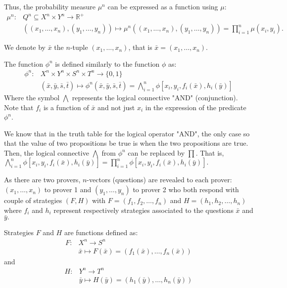 Thus, the probability measure $\mu^n$ can be expressed as a function using $\mu$: 
 \begin{align*}
\mu^n:  & Q^n \subseteq X^n \times Y^n  \longrightarrow \mathbb{R}^+ \\
  & ((x_1,\ldots, x_n), (y_1,\ldots, y_n)) \longmapsto \mu^n((x_1,\ldots, x_n), (y_1,\ldots, y_n))=\prod_{i=1}^n  \mu (x_i, y_i). 
 \end{align*}
 
We denote by  $\bar{x}$ the $n$-tuple $(x_1,\ldots, x_n)$, that is $\bar{x}=(x_1,\ldots, x_n)$. 

The function $\phi^n$ is defined similarly to the function $ \phi$ as:
\begin{align*}
\phi^n: & X^n \times Y^n \times S^n \times T^n  \longrightarrow  \{0,1\}\\ 
& (\bar{x}, \bar{y},\bar{s}, \bar{t})  \longmapsto  \phi^n(\bar{x}, \bar{y},\bar{s}, \bar{t}) = \bigwedge\limits_{i=1}^n \phi [x_i,y_i, f_i(\bar{x}), h_i(\bar{y})]
\end{align*}
Where the symbol $\bigwedge$ represents the logical connective "AND" (conjunction).
Note that $f_i$ is a function of $\bar{x}$ and not just $x_i$  in the expression of the predicate $\phi^n$.

We know that in the truth table for the logical operator "AND", the only case so that the value of two propositions be true is when the two propositions are true. Then, the logical connective $\bigwedge$ from $\phi^n$ can be replaced by $\prod.$ That is,  $\bigwedge\limits_{i=1}^n \phi [x_i,y_i, f_i(\bar{x}), h_i(\bar{y})]=\prod\limits_{i=1}^n  \phi [x_i,y_i, f_i(\bar{x}), h_i(\bar{y})].$

As there are two provers, $n$-vectors (questions) are revealed to each prover:  $(x_1, \ldots , x_n)$ to prover 1 and  $(y_1, \ldots , y_n)$ to prover 2 who both respond with  couple of strategies $(F,H)$ with $F=(f_1, f_2, \ldots, f_n)$ and $H=(h_1, h_2, \ldots, h_n)$ where $f_i$ and $h_i$ represent respectively strategies associated to the questions $\bar{x}$ and $\bar{y}.$

Strategies $F$ and $H$ are functions defined as:
 \begin{align*}
 F: & X^n \longrightarrow S^n\\
 &  \bar{x} \longmapsto F(\bar{x})=(f_1(\bar{x}), \ldots , f_n(\bar{x})) \end{align*}  and 
 \begin{align*} 
 H: & Y^n \longrightarrow T^n\\
 & \bar{y} \longmapsto H(\bar{y})=(h_1(\bar{y}), \ldots , h_n(\bar{y}))
 \end{align*}

